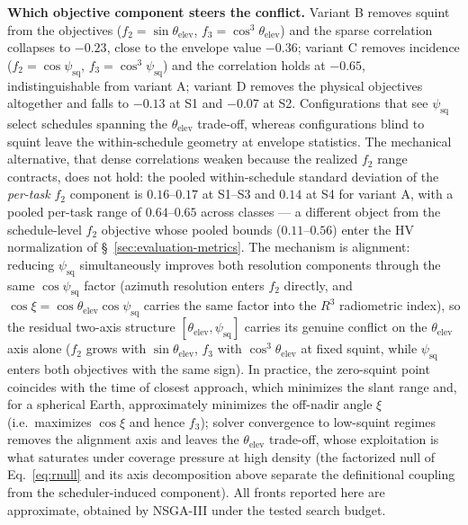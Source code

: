 \documentclass[preprint,12pt,authoryear]{elsarticle}
\begin{document}
\textbf{Which objective component steers the conflict.}
Variant B removes squint from the objectives ($f_2=\sin\theta_{\text{elev}}$,
$f_3=\cos^3\theta_{\text{elev}}$) and the sparse correlation collapses to
$-0.23$, close to the envelope value $-0.36$; variant C removes incidence
($f_2=\cos\psi_{\text{sq}}$, $f_3=\cos^3\psi_{\text{sq}}$) and the correlation
holds at $-0.65$, indistinguishable from variant A; variant D removes the
physical objectives altogether and falls to $-0.13$ at S1 and $-0.07$ at S2.
Configurations that see $\psi_{\text{sq}}$ select schedules spanning the
$\theta_{\text{elev}}$ trade-off, whereas configurations blind to squint leave
the within-schedule geometry at envelope statistics. The mechanical
alternative, that dense correlations weaken because the realized $f_2$ range
contracts, does not hold: the pooled within-schedule standard deviation of
the \emph{per-task} $f_2$ component is $0.16$--$0.17$ at S1--S3 and $0.14$ at
S4 for variant A, with a pooled per-task range of $0.64$--$0.65$ across classes ---
a different object from the schedule-level $f_2$ objective whose pooled
bounds ($0.11$--$0.56$) enter the HV normalization of
\S~\ref{sec:evaluation-metrics}. The mechanism is alignment: reducing
$\psi_{\text{sq}}$ simultaneously improves both resolution components through
the same $\cos\psi_{\text{sq}}$ factor (azimuth resolution enters $f_2$
directly, and $\cos\xi = \cos\theta_{\text{elev}}\cos\psi_{\text{sq}}$
carries the same factor into the $R^3$ radiometric index), so the residual
two-axis structure $[\theta_{\text{elev}}, \psi_{\text{sq}}]$ carries its
genuine conflict on the $\theta_{\text{elev}}$ axis alone ($f_2$ grows with
$\sin\theta_{\text{elev}}$, $f_3$ with $\cos^3\theta_{\text{elev}}$ at fixed
squint, while $\psi_{\text{sq}}$ enters both objectives with the same sign).
In practice, the zero-squint point coincides with the time of closest
approach, which minimizes the slant range and, for a spherical Earth,
approximately minimizes the off-nadir angle $\xi$ (i.e.\ maximizes
$\cos\xi$ and hence $f_3$); solver convergence to low-squint regimes
removes the alignment axis and leaves the $\theta_{\text{elev}}$ trade-off,
whose exploitation is what saturates under coverage pressure at high density
(the factorized null of Eq.~\ref{eq:rnull} and its axis decomposition above
separate the definitional coupling from the scheduler-induced component).
All fronts
reported here are approximate, obtained by NSGA-III under the tested search
budget.
\end{document}

